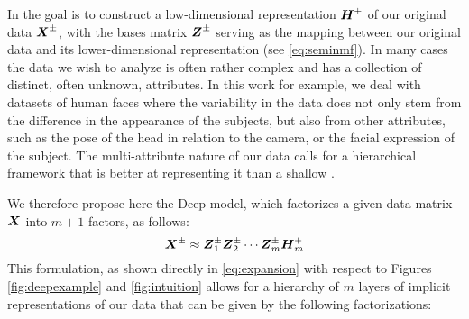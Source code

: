 \documentclass[10pt,journal,compsoc]{IEEEtran}
\begin{document}
In \seminmf the goal is to construct a low-dimensional representation $\boldsymbol{H}^+$ of our original data $\boldsymbol{X}^\pm$, with the bases matrix $\boldsymbol{Z}^\pm$ serving as the mapping
between our original data and its lower-dimensional representation (see \autoref{eq:seminmf}). In many cases the data we wish to analyze is often rather complex and has a collection of distinct, often unknown, attributes. In this work for example, we deal with datasets of human faces where the variability in the data does not only stem from the difference in the appearance of the subjects, but also from other attributes, such as the pose of the head in relation to the camera, or the facial expression of the subject. The multi-attribute nature of our data calls for a hierarchical framework that is better at representing it than a shallow \seminmf.

We therefore propose here the Deep \seminmf model, which factorizes a given data matrix $\boldsymbol{X}$ into $m+1$ factors, as follows:
\begin{equation}{\boldsymbol{X}}^{\pm} \approx {\boldsymbol{Z}}_1^{\pm}{\boldsymbol{Z}}_2^{\pm}\cdots{\boldsymbol{Z}}_m^{\pm}{\boldsymbol{H}}^+_m
\end{equation}
This formulation, as shown directly in \autoref{eq:expansion} with respect to Figures \ref{fig:deepexample} and \ref{fig:intuition} allows for a hierarchy of $m$ layers of implicit representations of our data that can be given by the following factorizations:
\end{document}
